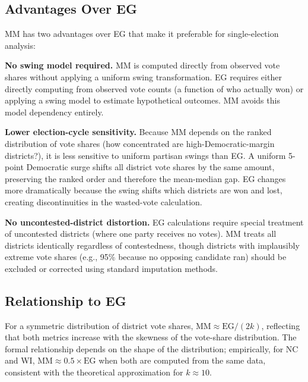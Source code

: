 \subsection{Advantages Over EG}

MM has two advantages over EG that make it preferable for single-election analysis:

\textbf{No swing model required.} MM is computed directly from observed vote shares
without applying a uniform swing transformation. EG requires either directly computing
from observed vote counts (a function of who actually won) or applying a swing model
to estimate hypothetical outcomes. MM avoids this model dependency entirely.

\textbf{Lower election-cycle sensitivity.} Because MM depends on the ranked distribution
of vote shares (how concentrated are high-Democratic-margin districts?), it is less
sensitive to uniform partisan swings than EG. A uniform 5-point Democratic surge shifts
all district vote shares by the same amount, preserving the ranked order and therefore
the mean-median gap. EG changes more dramatically because the swing shifts which districts
are won and lost, creating discontinuities in the wasted-vote calculation.

\textbf{No uncontested-district distortion.} EG calculations require special treatment
of uncontested districts (where one party receives no votes). MM treats all districts
identically regardless of contestedness, though districts with implausibly extreme
vote shares (e.g., 95\% because no opposing candidate ran) should be excluded or
corrected using standard imputation methods.

\subsection{Relationship to EG}

For a symmetric distribution of district vote shares, $\text{MM} \approx \text{EG}/(2k)$,
reflecting that both metrics increase with the skewness of the vote-share distribution.
The formal relationship depends on the shape of the distribution; empirically, for NC and
WI, $\text{MM} \approx 0.5 \times \text{EG}$ when both are computed from the same data,
consistent with the theoretical approximation for $k \approx 10$.
